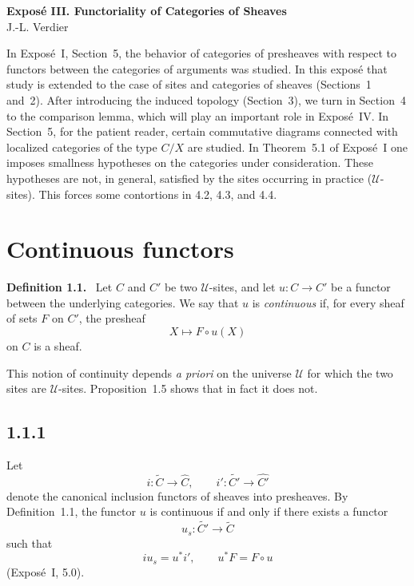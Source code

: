 \documentclass[11pt]{article}
\newcommand{\U}{\mathcal{U}}
\newenvironment{statement}[1]{\par\medskip\noindent\textbf{#1.}\ }{\par\medskip}
\begin{document}
\begin{center}
{\Large \textbf{Expos\'e III. Functoriality of Categories of Sheaves}}\\[0.35em]
J.-L. Verdier
\end{center}

\bigskip


\medskip

In Expos\'e~I, Section~5, the behavior of categories of presheaves with respect to functors between the categories of arguments was studied. In this expos\'e that study is extended to the case of sites and categories of sheaves (Sections~1 and~2). After introducing the induced topology (Section~3), we turn in Section~4 to the comparison lemma, which will play an important role in Expos\'e~IV. In Section~5, for the patient reader, certain commutative diagrams connected with localized categories of the type \(C/X\) are studied. In Theorem~5.1 of Expos\'e~I one imposes smallness hypotheses on the categories under consideration. These hypotheses are not, in general, satisfied by the sites occurring in practice (\(\U\)-sites). This forces some contortions in 4.2, 4.3, and 4.4.

\section{Continuous functors}

\begin{statement}{Definition 1.1}
Let \(C\) and \(C'\) be two \(\U\)-sites, and let \(u:C\to C'\) be a functor between the underlying categories. We say that \(u\) is \emph{continuous} if, for every sheaf of sets \(F\) on \(C'\), the presheaf
\[
X\longmapsto F\circ u(X)
\]
on \(C\) is a sheaf.
\end{statement}

This notion of continuity depends \emph{a priori} on the universe \(\U\) for which the two sites are \(\U\)-sites. Proposition~1.5 shows that in fact it does not.

\subsection*{1.1.1}
Let
\[
i:\widetilde C\longrightarrow \widehat C,
\qquad
i':\widetilde{C'}\longrightarrow \widehat{C'}
\]
denote the canonical inclusion functors of sheaves into presheaves. By Definition~1.1, the functor \(u\) is continuous if and only if there exists a functor
\[
u_s:\widetilde{C'}\longrightarrow \widetilde C
\]
such that
\[
i u_s = u^* i',\qquad u^*F=F\circ u
\]
(Expos\'e~I, 5.0).
\end{document}
